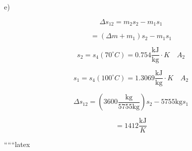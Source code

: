 e) 

\[
\Delta s_{12} = m_2 s_2 - m_1 s_1
\]

\[
= (\Delta m + m_1) s_2 - m_1 s_1
\]

\[
s_2 = s_4 (70^\circ C) = 0.754 \frac{\text{kJ}}{\text{kg}} \cdot K \quad A_2
\]

\[
s_1 = s_4 (100^\circ C) = 1.3069 \frac{\text{kJ}}{\text{kg}} \cdot K \quad A_2
\]

\[
\Delta s_{12} = \left(3600 \frac{\text{kg}}{5755 \text{kg}}\right) s_2 - 5755 \text{kg} s_1
\]

\[
= 1412 \frac{\text{kJ}}{K}
\]

``````latex